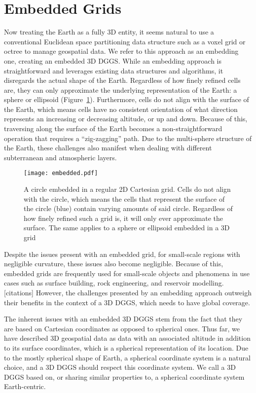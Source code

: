 \section{Embedded Grids} \label{chap:3:embedded}
Now treating the Earth as a fully 3D entity, it seems natural to use a conventional Euclidean space partitioning data structure such as a voxel grid or octree to manage geospatial data.
We refer to this approach as an embedding one, creating an embedded 3D DGGS.
While an embedding approach is straightforward and leverages existing data structures and algorithms, it disregards the actual shape of the Earth.
Regardless of how finely refined cells are, they can only approximate the underlying representation of the Earth: a sphere or ellipsoid (Figure~\ref{fig:embedded}).
Furthermore, cells do not align with the surface of the Earth, which means cells have no consistent orientation of what direction represents an increasing or decreasing altitude, or up and down.
Because of this, traversing along the surface of the Earth becomes a non-straightforward operation that requires a ``zig-zagging'' path.
Due to the multi-sphere structure of the Earth, these challenges also manifest when dealing with different subterranean and atmospheric layers.


\begin{figure}[ht!]
	\centering
	\texttt{[image: embedded.pdf]}
	\caption[A circle embedded in a regular Cartesian grid]{
		A circle embedded in a regular 2D Cartesian grid.
		Cells do not align with the circle, which means the cells that represent the surface of the circle (blue) contain varying amounts of said circle.
		Regardless of how finely refined such a grid is, it will only ever approximate the surface.
		The same applies to a sphere or ellipsoid embedded in a 3D grid
	}
	\label{fig:embedded}
\end{figure}


Despite the issues present with an embedded grid, for small-scale regions with negligible curvature, these issues also become negligible.
Because of this, embedded grids are frequently used for small-scale objects and phenomena in use cases such as surface building, rock engineering, and reservoir modelling. [citations]
However, the challenges presented by an embedding approach outweigh their benefits in the context of a 3D DGGS, which needs to have global coverage.


The inherent issues with an embedded 3D DGGS stem from the fact that they are based on Cartesian coordinates as opposed to spherical ones.
Thus far, we have described 3D geospatial data as data with an associated altitude in addition to its surface coordinates, which is a spherical representation of its location.
Due to the mostly spherical shape of Earth, a spherical coordinate system is a natural choice, and a 3D DGGS should respect this coordinate system.
We call a 3D DGGS based on, or sharing similar properties to, a spherical coordinate system Earth-centric.


